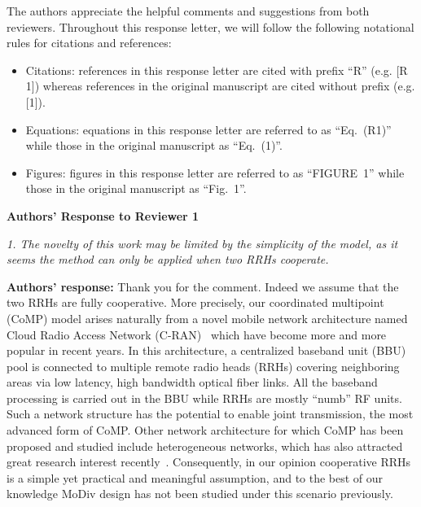 \documentclass[onecolumn, 11pt, draftclsnofoot]{IEEEtran}
\begin{document}
The authors appreciate the helpful comments and suggestions from both reviewers. 
Throughout this response letter, we will follow the following notational
rules for citations and references:
\begin{itemize}
  \item Citations: references in this response letter are cited with prefix
  ``R'' (e.g. [R 1]) whereas references in the original manuscript are cited
  without prefix (e.g. [1]).
  \item Equations: equations in this response letter are referred to as
  ``Eq.~(R1)''  while those in the original manuscript as ``Eq.~(1)''.
  \item Figures: figures in this response letter are referred to as
  ``FIGURE~1''  while those in the original manuscript as ``Fig.~1''.
\end{itemize}

\begin{center}
  {\LARGE \textbf{Authors' Response to Reviewer 1}}
\end{center}


 
\noindent
\emph{1. The novelty of this work may be limited by the simplicity of the model,
as it seems the method can only be applied when two RRHs cooperate. }

\noindent \textbf{Authors' response:} 
Thank you for the comment. Indeed we assume that the two RRHs are fully
cooperative. More precisely, our coordinated multipoint (CoMP) model arises
naturally from a novel mobile network architecture named Cloud Radio Access
Network (C-RAN)~\citep[R][]{6897914}\citep[R][]{6923535} which have
become more and more popular in recent years. In this architecture, a
centralized baseband unit (BBU) pool is connected to multiple remote radio heads
(RRHs) covering neighboring areas via low latency, high bandwidth optical fiber
links. All the baseband processing is carried out in the BBU while RRHs are
mostly ``numb'' RF units. Such a network structure has the potential to enable
joint transmission, the most advanced form of CoMP. Other network architecture
for which CoMP has been proposed and studied include heterogeneous networks,
which has also attracted great research interest
recently~\citep[R][]{6928420}\citep[R][]{6146489}. Consequently, in our opinion
cooperative RRHs is a simple yet practical and meaningful assumption, and
to the best of our knowledge MoDiv design has not been studied under this
scenario previously.
\end{document}
